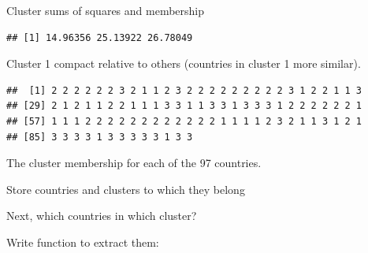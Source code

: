 \documentclass[ignorenonframetext,]{beamer}
\newenvironment{Shaded}{\begin{snugshade}}{\end{snugshade}}
\newcommand{\ControlFlowTok}[1]{\textcolor[rgb]{0.13,0.29,0.53}{\textbf{#1}}}
\newcommand{\DataTypeTok}[1]{\textcolor[rgb]{0.13,0.29,0.53}{#1}}
\newcommand{\FloatTok}[1]{\textcolor[rgb]{0.00,0.00,0.81}{#1}}
\newcommand{\KeywordTok}[1]{\textcolor[rgb]{0.13,0.29,0.53}{\textbf{#1}}}
\newcommand{\NormalTok}[1]{#1}
\newcommand{\OperatorTok}[1]{\textcolor[rgb]{0.81,0.36,0.00}{\textbf{#1}}}
\newcommand{\StringTok}[1]{\textcolor[rgb]{0.31,0.60,0.02}{#1}}
\begin{document}
\begin{frame}[fragile]{Cluster sums of squares and membership}
\protect\hypertarget{cluster-sums-of-squares-and-membership}{}

\begin{Shaded}
\end{Shaded}

\begin{verbatim}
## [1] 14.96356 25.13922 26.78049
\end{verbatim}

Cluster 1 compact relative to others (countries in cluster 1 more
similar).

\begin{Shaded}
\end{Shaded}

\begin{verbatim}
##  [1] 2 2 2 2 2 2 3 2 1 1 2 3 2 2 2 2 2 2 2 2 2 3 1 2 2 1 1 3
## [29] 2 1 2 1 1 2 2 1 1 1 3 3 1 1 3 3 1 3 3 3 1 2 2 2 2 2 2 1
## [57] 1 1 1 2 2 2 2 2 2 2 2 2 2 2 2 1 1 1 1 2 3 2 1 1 3 1 2 1
## [85] 3 3 3 3 1 3 3 3 3 3 1 3 3
\end{verbatim}

The cluster membership for each of the 97 countries.

\end{frame}

\begin{frame}[fragile]{Store countries and clusters to which they
belong}
\protect\hypertarget{store-countries-and-clusters-to-which-they-belong}{}

\begin{Shaded}
\end{Shaded}

Next, which countries in which cluster?

Write function to extract them:

\begin{Shaded}
\end{Shaded}

\end{frame}
\end{document}
